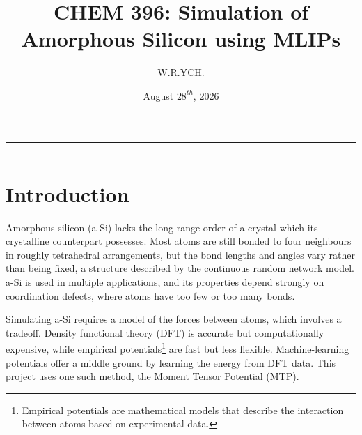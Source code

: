\documentclass{article}
\begin{document}
\title{CHEM 396: Simulation of Amorphous Silicon using MLIPs}
\author{W.R.YCH.}
\date{August \(28^{th}\), 2026}
\setcounter{Maxaffil}{0}
\renewcommand\Affilfont{\itshape\small}
\maketitle

\noindent\rule{\textwidth}{0.4pt}
\thispagestyle{empty}
\begin{abstract}
\end{abstract}
\noindent\rule{\textwidth}{0.4pt}
\clearpage

\thispagestyle{empty}
{
  \hypersetup{linkcolor=black}
  \tableofcontents
}
\clearpage

\setcounter{page}{1}

\section{Introduction}

Amorphous silicon (a-Si) lacks the long-range order of a crystal which its crystalline counterpart possesses. Most atoms are still bonded to four neighbours in roughly tetrahedral arrangements, but the bond lengths and angles vary rather than being fixed, a structure described by the continuous random network model. a-Si is used in multiple applications, and its properties depend strongly on coordination defects, where atoms have too few or too many bonds.

Simulating a-Si requires a model of the forces between atoms, which involves a tradeoff. Density functional theory (DFT) is accurate but computationally expensive, while empirical potentials\footnote{Empirical potentials are mathematical models that describe the interaction between atoms based on experimental data.} are fast but less flexible. Machine-learning potentials offer a middle ground by learning the energy from DFT data. This project uses one such method, the Moment Tensor Potential (MTP).
\end{document}
